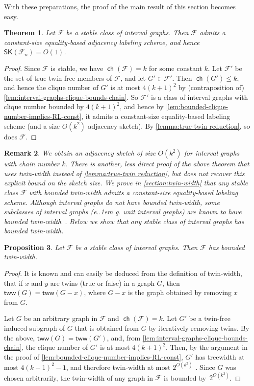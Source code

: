 \documentclass{article}
\makeatletter
\newtheorem{theorem}{Theorem}\newtheorem{lemma}[theorem]{Lemma}\newtheorem{proposition}[theorem]{Proposition}\newtheorem{corollary}[theorem]{Corollary}\newtheorem{definition}[theorem]{Definition}\newtheorem{claim}[theorem]{Claim}\newtheorem{remark}[theorem]{Remark}\newtheorem{observation}[theorem]{Observation}\newtheorem{conjecture}[theorem]{Conjecture}\newtheorem{example}[theorem]{Example}
\newcommand{\cF}{\ensuremath{\mathcal{F}}}
\newcommand{\tw}{\mathsf{tww}}
\newcommand*\eg{e.\kern.1em g.\@\xspace} %
\newcommand{\RL}{\mathsf{SK}}
\DeclareMathOperator\ch{\mathsf{ch}}
\makeatother
\begin{document}
With these preparations, the proof of the main result of this section becomes easy.

\begin{theorem}
\label{thm:interval graphs}
Let $\cF$  be a stable class of interval graphs.
Then $\cF$ admits a constant-size equality-based adjacency labeling scheme, and hence $\RL(\cF_n) = O(1)$.
\end{theorem}
\begin{proof}
Since $\cF$ is stable, we have $\ch(\cF) = k$ for some constant $k$. Let $\cF'$ be the set of
true-twin-free members of $\cF$, and let $G' \in \cF'$. Then $\ch(G')\leq k$, and hence the clique
number of $G'$ is at most $4(k+1)^2$ by (contraposition of)
\cref{lem:interval-graphs-clique-bounds-chain}. So $\cF'$ is a class of interval graphs with clique
number bounded by $4(k+1)^2$, and hence by \cref{lem:bounded-clique-number-implies-RL-const}, it
admits a constant-size equality-based labeling scheme (and a size $O(k^2)$ adjacency sketch). By
\cref{lemma:true-twin reduction}, so does $\cF$.
\end{proof}

\begin{remark}
We obtain an adjacency sketch of size $O(k^2)$ for interval graphs with chain number $k$.  There is
another, less direct proof of the above theorem that uses \emph{twin-width} instead of
\cref{lemma:true-twin reduction}, but does not recover this explicit bound on the sketch size. We
prove in \cref{section:twin-width} that any stable class $\cF$ with bounded twin-width admits a
constant-size equality-based labeling scheme. Although interval graphs do not have bounded
twin-width, some subclasses of interval graphs (\eg unit interval graphs) are known to have
bounded twin-width~\cite{BKTW20}. Below we show that any stable class of interval graphs has bounded
twin-width. 
\end{remark}

\begin{proposition}
\label{prop:stable interval twin-width}
Let $\cF$ be a stable class of interval graphs. Then $\cF$ has bounded twin-width.
\end{proposition}
\begin{proof}
It is known and can easily be deduced from the definition of twin-width, that if $x$ and $y$ are twins (true or false) in a graph $G$, then $\tw(G) = \tw(G-x)$, where $G-x$ is the graph obtained by removing $x$ from $G$.

Let $G$ be an arbitrary graph in $\cF$ and $\ch(\cF) = k$. Let $G'$ be a twin-free induced subgraph of $G$ that is obtained from $G$ by iteratively removing twins. By the above, $\tw(G) = \tw(G')$, and, from \cref{lem:interval-graphs-clique-bounds-chain}, the clique number of $G'$ is at most $4(k+1)^2$. 
Then, by the argument in the proof of
\cref{lem:bounded-clique-number-implies-RL-const}, $G'$ has treewidth at most $4(k+1)^2-1$, and therefore twin-width at most $2^{O(k^2)}$ \cite{BD23}. Since $G$ was chosen arbitrarily, the twin-width of any graph in $\cF$ is bounded by~$2^{O(k^2)}$.
\end{proof}
\end{document}
